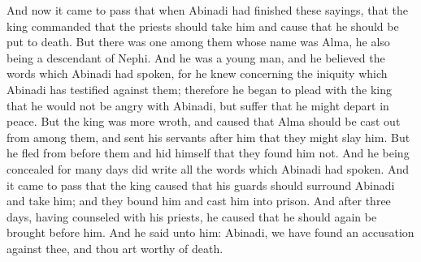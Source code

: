 \bchapter
\bverse \iffalse And now it came to pass that when Abinadi had finished these sayings, that the king commanded that the priests should take him and cause that he should be put to death. \fi
And now it came to pass that when Abinadi had finished these sayings, that the king commanded that the priests should take him and cause that he should be put to death.
\bverse \iffalse But there was one among them whose name was Alma, he also being a descendant of Nephi. And he was a young man, and he believed the words which Abinadi had spoken, for he knew concerning the iniquity which Abinadi has testified against them; therefore he began to plead with the king that he would not be angry with Abinadi, but suffer that he might depart in peace. \fi
But there was one among them whose name was Alma, he also being a descendant of Nephi. And he was a young man, and he believed the words which Abinadi had spoken, for he knew concerning the iniquity which Abinadi has testified against them; therefore he began to plead with the king that he would not be angry with Abinadi, but suffer that he might depart in peace.
\bverse \iffalse But the king was more wroth, and caused that Alma should be cast out from among them, and sent his servants after him that they might slay him. \fi
But the king was more wroth, and caused that Alma should be cast out from among them, and sent his servants after him that they might slay him.
\bverse \iffalse But he fled from before them and hid himself that they found him not. And he being concealed for many days did write all the words which Abinadi had spoken. \fi
But he fled from before them and hid himself that they found him not. And he being concealed for many days did write all the words which Abinadi had spoken.
\bverse \iffalse And it came to pass that the king caused that his guards should surround Abinadi and take him; and they bound him and cast him into prison. \fi
And it came to pass that the king caused that his guards should surround Abinadi and take him; and they bound him and cast him into prison.
\bverse \iffalse And after three days, having counseled with his priests, he caused that he should again be brought before him. \fi
And after three days, having counseled with his priests, he caused that he should again be brought before him.
\bverse \iffalse And he said unto him: Abinadi, we have found an accusation against thee, and thou art worthy of death. \fi
And he said unto him: Abinadi, we have found an accusation against thee, and thou art worthy of death.
